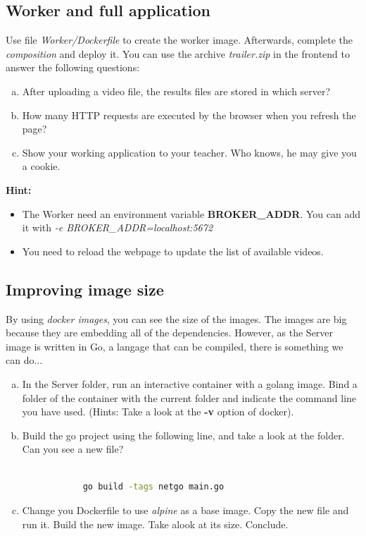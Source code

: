 \documentclass[a4paper,11pt]{exam}
\begin{document}
\subsection{Worker and full application}
	\begin{questions}
	
	\question Use file \textit{Worker/Dockerfile} to create the worker image. Afterwards, complete the \textit{composition} and deploy it. You can use the archive \textit{trailer.zip} in the frontend to answer the following questions:
	
	\begin{enumerate}[(a)] %
		\item After uploading a video file, the results files are stored in which server? 
		\item How many HTTP requests are executed by the browser when you refresh the page?
		\item Show your working application to your teacher. Who knows, he may give you a cookie. 
	\end{enumerate}
	
	\textbf{Hint:}
	\begin{itemize}
	\item The Worker need an environment variable \textbf{BROKER\_ADDR}. You can add it with \textit{-e BROKER\_ADDR=localhost:5672}
	\item You need to reload the webpage to update the list of available videos. 
	\end{itemize}
	\end{questions}


\subsection{Improving image size}	
	\begin{questions}

	\question By using \textit{docker images}, you can see the size of the images. The images are big because they are embedding all of the dependencies. However, as the Server image is written in Go, a langage that can be compiled, there is something we can do...
	
	\begin{enumerate}[(a)] %
		\item In the Server folder, run an interactive container with a golang image. Bind a folder of the container with the current folder and indicate the command line you have used. (Hints: Take a look at the \textbf{-v} option of docker).
		\item Build the go project using the following line, and take a look at the folder. Can you see a new file?

		\begin{lstlisting}[frame=single,language={sh}]  % Start your code-block

			go build -tags netgo main.go

		\end{lstlisting}
		\item Change you Dockerfile to use \textit{alpine} as a base image. Copy the new file and run it. Build the new image. Take alook at its size. Conclude. 
	\end{enumerate}
\end{questions}
\end{document}
